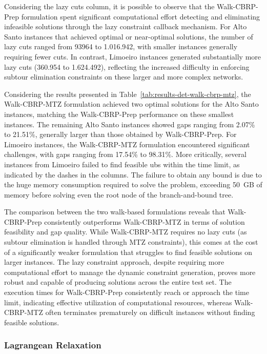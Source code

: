 Considering the lazy cuts column, it is possible to observe that the Walk-CBRP-Prep formulation spent significant computational effort detecting and eliminating infeasible solutions through the lazy constraint callback mechanism. For Alto Santo instances that achieved optimal or near-optimal solutions, the number of lazy cuts ranged from 93964 to 1.016.942, with smaller instances generally requiring fewer cuts. In contrast, Limoeiro instances generated substantially more lazy cuts (360.954 to 1.624.492), reflecting the increased difficulty in enforcing subtour elimination constraints on these larger and more complex networks.

Considering the results presented in Table~\ref{tab:results-det-walk-cbrp-mtz}, the Walk-CBRP-MTZ formulation achieved two optimal solutions for the Alto Santo instances, matching the Walk-CBRP-Prep performance on these smallest instances. The remaining Alto Santo instances showed gaps ranging from 2.07\% to 21.51\%, generally larger than those obtained by Walk-CBRP-Prep. For Limoeiro instances, the Walk-CBRP-MTZ formulation encountered significant challenges, with gaps ranging from 17.54\% to 98.31\%. More critically, several instances from Limoeiro failed to find feasible \gls{ub}s within the time limit, as indicated by the dashes in the columns. The failure to obtain any bound is due to the huge memory consumption required to solve the problem, exceeding 50~GB of memory before solving even the root node of the branch-and-bound tree.

The comparison between the two walk-based formulations reveals that Walk-CBRP-Prep consistently outperforms Walk-CBRP-MTZ in terms of solution feasibility and gap quality. While Walk-CBRP-MTZ requires no lazy cuts (as subtour elimination is handled through MTZ constraints), this comes at the cost of a significantly weaker formulation that struggles to find feasible solutions on larger instances. The lazy constraint approach, despite requiring more computational effort to manage the dynamic constraint generation, proves more robust and capable of producing solutions across the entire test set. The execution times for Walk-CBRP-Prep consistently reach or approach the time limit, indicating effective utilization of computational resources, whereas Walk-CBRP-MTZ often terminates prematurely on difficult instances without finding feasible solutions.

\subsubsection{Lagrangean Relaxation}\label{subsec:lagrangean-relaxation}

